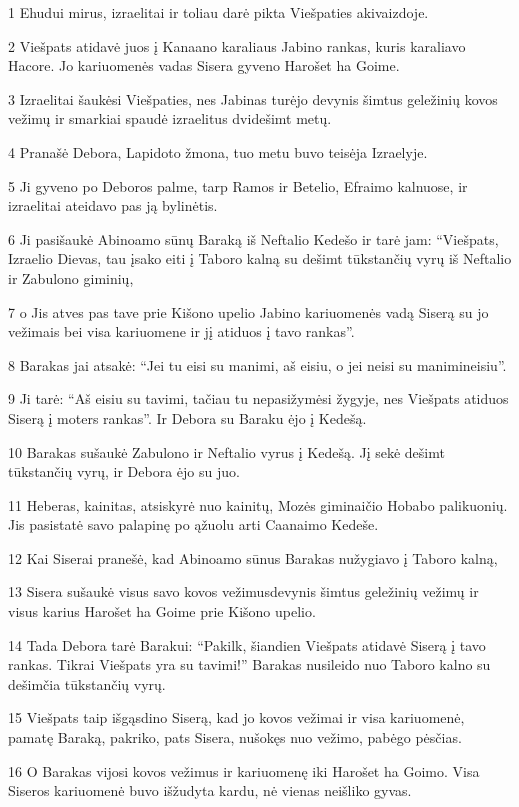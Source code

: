 \par 1 Ehudui mirus, izraelitai ir toliau darė pikta Viešpaties akivaizdoje. 
\par 2 Viešpats atidavė juos į Kanaano karaliaus Jabino rankas, kuris karaliavo Hacore. Jo kariuomenės vadas Sisera gyveno Harošet ha Goime. 
\par 3 Izraelitai šaukėsi Viešpaties, nes Jabinas turėjo devynis šimtus geležinių kovos vežimų ir smarkiai spaudė izraelitus dvidešimt metų. 
\par 4 Pranašė Debora, Lapidoto žmona, tuo metu buvo teisėja Izraelyje. 
\par 5 Ji gyveno po Deboros palme, tarp Ramos ir Betelio, Efraimo kalnuose, ir izraelitai ateidavo pas ją bylinėtis. 
\par 6 Ji pasišaukė Abinoamo sūnų Baraką iš Neftalio Kedešo ir tarė jam: “Viešpats, Izraelio Dievas, tau įsako eiti į Taboro kalną su dešimt tūkstančių vyrų iš Neftalio ir Zabulono giminių, 
\par 7 o Jis atves pas tave prie Kišono upelio Jabino kariuomenės vadą Siserą su jo vežimais bei visa kariuomene ir jį atiduos į tavo rankas”. 
\par 8 Barakas jai atsakė: “Jei tu eisi su manimi, aš eisiu, o jei neisi su manimi­neisiu”. 
\par 9 Ji tarė: “Aš eisiu su tavimi, tačiau tu nepasižymėsi žygyje, nes Viešpats atiduos Siserą į moters rankas”. Ir Debora su Baraku ėjo į Kedešą. 
\par 10 Barakas sušaukė Zabulono ir Neftalio vyrus į Kedešą. Jį sekė dešimt tūkstančių vyrų, ir Debora ėjo su juo. 
\par 11 Heberas, kainitas, atsiskyrė nuo kainitų, Mozės giminaičio Hobabo palikuonių. Jis pasistatė savo palapinę po ąžuolu arti Caanaimo Kedeše. 
\par 12 Kai Siserai pranešė, kad Abinoamo sūnus Barakas nužygiavo į Taboro kalną, 
\par 13 Sisera sušaukė visus savo kovos vežimus­devynis šimtus geležinių vežimų ir visus karius Harošet ha Goime prie Kišono upelio. 
\par 14 Tada Debora tarė Barakui: “Pakilk, šiandien Viešpats atidavė Siserą į tavo rankas. Tikrai Viešpats yra su tavimi!” Barakas nusileido nuo Taboro kalno su dešimčia tūkstančių vyrų. 
\par 15 Viešpats taip išgąsdino Siserą, kad jo kovos vežimai ir visa kariuomenė, pamatę Baraką, pakriko, pats Sisera, nušokęs nuo vežimo, pabėgo pėsčias. 
\par 16 O Barakas vijosi kovos vežimus ir kariuomenę iki Harošet ha Goimo. Visa Siseros kariuomenė buvo išžudyta kardu, nė vienas neišliko gyvas. 
